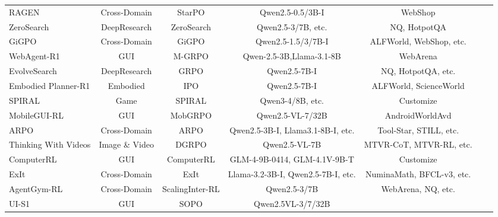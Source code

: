 \documentclass{llmxive}
\providecommand{\Result}{
  \begin{tikzpicture}[baseline=(char.base)]
    \fill[textgreen!50] (0,0) circle (0.18);
    \node[white, font=\scriptsize\rmfamily, inner sep=0pt] (char) at (0,0) {A};
  \end{tikzpicture}
}
\providecommand{\Format}{
  \begin{tikzpicture}[baseline=(char.base)]
    \fill[textred!50] (0,0) circle (0.18);
    \node[white, font=\scriptsize\rmfamily, inner sep=0pt] (char) at (0,0) {F};
  \end{tikzpicture}
}
\providecommand{\Efficient}{
  \begin{tikzpicture}[baseline=(char.base)]
    \fill[textyellow!50] (0,0) circle (0.18);
    \node[white, font=\scriptsize\rmfamily, inner sep=0pt] (char) at (0,0) {E};
  \end{tikzpicture}
}
\providecommand{\Process}{
  \begin{tikzpicture}[baseline=(char.base)]
    \fill[frameblue!50] (0,0) circle (0.18);
    \node[white, font=\scriptsize\rmfamily, inner sep=0pt] (char) at (0,0) {P};
  \end{tikzpicture}
}
\begin{document}
\begin{table}[]
{\begin{tabular}{lcccccc}
RAGEN \cite{RAGEN} &
  Cross-Domain & StarPO &
  Qwen2.5-0.5/3B-I &
  WebShop &
  \Result\hspace{-0.4em}\Format  \\
ZeroSearch \cite{ZeroSearch} &
  DeepResearch & ZeroSearch &
  Qwen2.5-3/7B, etc. &
  NQ, HotpotQA &
  \Result \\
GiGPO \cite{GiGPO} &
  Cross-Domain & GiGPO &
  Qwen2.5-1.5/3/7B-I &
  ALFWorld, WebShop, etc. &
  \Result\hspace{-0.4em}\Process \\

  
WebAgent-R1 \cite{WebAgent-R1} &
  GUI & M-GRPO &
  Qwen-2.5-3B,Llama-3.1-8B &
  WebArena &
  \Result \\
EvolveSearch \cite{EvolveSearch} &
  DeepResearch &  GRPO &
  Qwen2.5-7B-I &
  NQ, HotpotQA, etc. &
  \Result\hspace{-0.4em}\Format \\
Embodied Planner-R1 \cite{Embodied_Planner-R1} &
  Embodied & IPO &
  Qwen2.5-7B-I &
  ALFWorld, ScienceWorld &
  \Result \\
SPIRAL \cite{SPIRAL} &
  Game & SPIRAL &
  Qwen3-4/8B, etc. &
  Customize &
  \Result \\
MobileGUI-RL \cite{MobileGUI-RL} &
  GUI & 
  MobGRPO & 
  Qwen2.5-VL-7/32B &
  AndroidWorldAvd &
  \Result\hspace{-0.4em}\Efficient \\
ARPO \cite{ARPO} &
  Cross-Domain &
  ARPO &
  Qwen2.5-3B-I, Llama3.1-8B-I, etc. &
  Tool-Star, STILL, etc. &
  \Result\hspace{-0.4em}\Format\hspace{-0.4em}\Process \\
Thinking With Videos \cite{Thinking_With_Videos} &
  Image \& Video &
  DGRPO &
  Qwen2.5-VL-7B &
  MTVR-CoT, MTVR-RL, etc. &
  \Result\hspace{-0.4em}\Format\hspace{-0.4em}\Process \\
ComputerRL \cite{ComputerRL} &
  GUI &
  ComputerRL &
  GLM-4-9B-0414, GLM-4.1V-9B-T &
  Customize &
  \Result \\
ExIt \cite{ExIt} &
  Cross-Domain &
  ExIt &
  Llama-3.2-3B-I, Qwen2.5-7B-I, etc. &
  NuminaMath, BFCL-v3, etc. &
  \Result \\
AgentGym-RL \cite{AgentGym-RL} &
  Cross-Domain &
   ScalingInter-RL &
  Qwen2.5-3/7B &
  WebArena, NQ, etc. &
  \Result \\
UI-S1 \cite{UI-S1} &
  GUI &
  SOPO &
  Qwen2.5VL-3/7/32B &

\end{tabular}}
\end{table}
\end{document}
